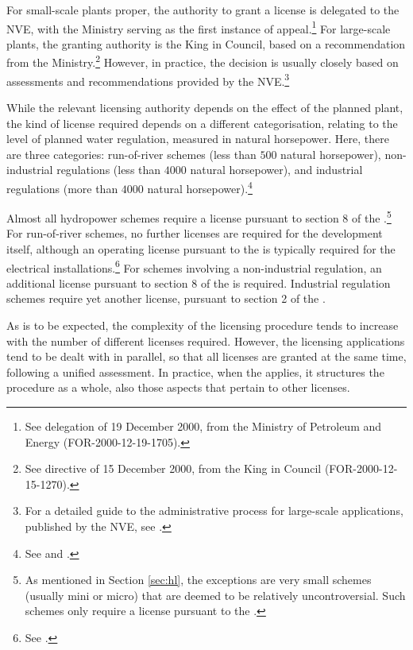 For small-scale plants proper, the authority to grant a license is delegated to the NVE, with the Ministry serving as the first instance of appeal.\footnote{See delegation of 19 December 2000, from the Ministry of Petroleum and Energy (FOR-2000-12-19-1705).} For large-scale plants, the granting authority is the King in Council, based on a recommendation from the Ministry.\footnote{See directive of 15 December 2000, from the King in Council (FOR-2000-12-15-1270).} However, in practice, the decision is usually closely based on assessments and recommendations provided by the NVE.\footnote{For a detailed guide to the administrative process for large-scale applications, published by the NVE, see \cite{stokker10}.}

While the relevant licensing authority depends on the effect of the planned plant, the kind of license required depends on a different categorisation, relating to the level of planned water regulation, measured in natural horsepower. Here, there are three categories: run-of-river schemes  (less than $500$ natural horsepower), non-industrial regulations (less than $4000$ natural horsepower), and industrial regulations (more than $4000$ natural horsepower).\footnote{See \cite[2]{wra17} and \cite[1,2]{ica17}.} %

Almost all hydropower schemes require a license pursuant to section 8 of the \cite{wra00}.\footnote{As mentioned in Section \ref{sec:hl}, the exceptions are very small schemes (usually mini or micro) that are deemed to be relatively uncontroversial. Such schemes only require a license pursuant to the \cite{pb08}.} For run-of-river schemes, no further licenses are required for the development itself, although an operating license pursuant to the \cite{ea90} is typically required for the electrical installations.\footnote{See \cite[3-1]{ea90}.} For schemes involving a non-industrial regulation, an additional license pursuant to section 8 of the \cite{wra17} is required. Industrial regulation schemes require yet another license, pursuant to section 2 of the \cite{ica17}.

As is to be expected, the complexity of the licensing procedure tends to increase with the number of different licenses required. However, the licensing applications tend to be dealt with in parallel, so that all licenses are granted at the same time, following a unified assessment. In practice, when the \cite{wra17} applies, it structures the procedure as a whole, also those aspects that pertain to other licenses. 

